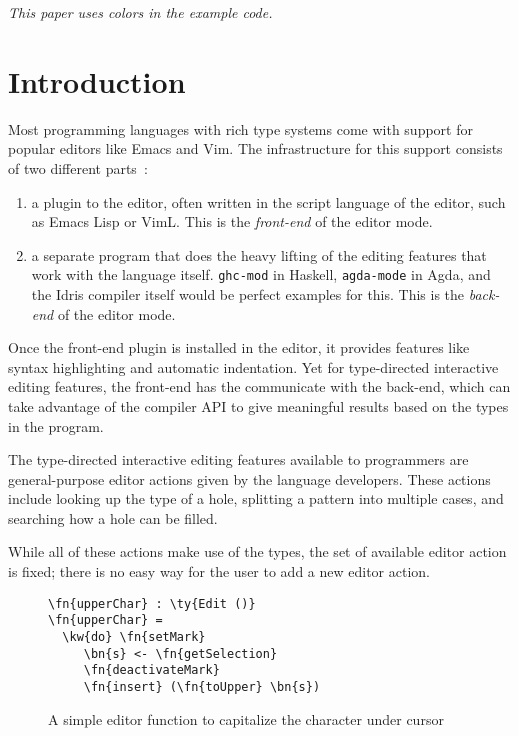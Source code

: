\documentclass[sigplan, authordraft]{acmart}
\newcommand\fakeslant[1]{%
  \special{pdf: literal 1 0 0.167 1 0 0 cm}#1\special{pdf: literal 1 0 -0.167 1 0 0 cm}}
\newcommand{\IdrisType}[1]{\textcolor{IdrisBlue}{#1}}
\newcommand{\IdrisBound}[1]{\textcolor{IdrisLilac}{\fakeslant{#1}}}
\newcommand{\IdrisFunction}[1]{\textcolor{IdrisGreen}{#1}}
\newcommand{\IdrisKeyword}[1]{{\textbf{#1}}}
\newcommand{\ty}[1]{\IdrisType{\texttt{#1}}}
\newcommand{\kw}[1]{\IdrisKeyword{\texttt{#1}}}
\newcommand{\fn}[1]{\IdrisFunction{\texttt{#1}}}
\newcommand{\bn}[1]{\IdrisBound{\texttt{#1}}}
\newcommand{\mt}[1]{\mbox{\texttt{#1}}}
\newcommand{\TODO}[1]{{\color{red}{[TODO: #1]}}}
\begin{document}
\emph{This paper uses colors in the example code.}

\section{Introduction}

Most programming languages with rich type systems come with support for popular
editors like Emacs and Vim. The infrastructure for this support consists of
two different parts~\cite{editTimeTactics}:

\begin{enumerate}
  \item a plugin to the editor, often written in the script language of the
    editor, such as Emacs Lisp or VimL. This is the \emph{front-end} of the
    editor mode.
  \item a separate program that does the heavy lifting of the editing features
    that work with the language itself.  \mt{ghc-mod} in Haskell,
    \mt{agda-mode} in Agda, and the Idris compiler itself would be perfect
    examples for this. This is the \emph{back-end} of the editor mode.
\end{enumerate}

Once the front-end plugin is installed in the editor, it provides features like
syntax highlighting and automatic indentation. Yet for type-directed
interactive editing features, the front-end has the communicate with the
back-end, which can take advantage of the compiler API to give meaningful
results based on the types in the program.

The type-directed interactive editing features available to programmers are
general-purpose editor actions given by the language developers. These actions
include looking up the type of a hole, splitting a pattern into multiple
cases, and searching how a hole can be filled.

While all of these actions make use of the types, the set of available editor
action is fixed; there is no easy way for the user to add a new editor action.
\TODO{the whole spiel about how my work makes it possible to add a new editor
action in Idris itself}

\begin{figure}[H]
\begin{Verbatim}
\fn{upperChar} : \ty{Edit ()}
\fn{upperChar} =
  \kw{do} \fn{setMark}
     \bn{s} <- \fn{getSelection}
     \fn{deactivateMark}
     \fn{insert} (\fn{toUpper} \bn{s})
\end{Verbatim}
\caption{A simple editor function to capitalize the character under cursor}
\label{fig:upperChar}
\end{figure}
\end{document}
